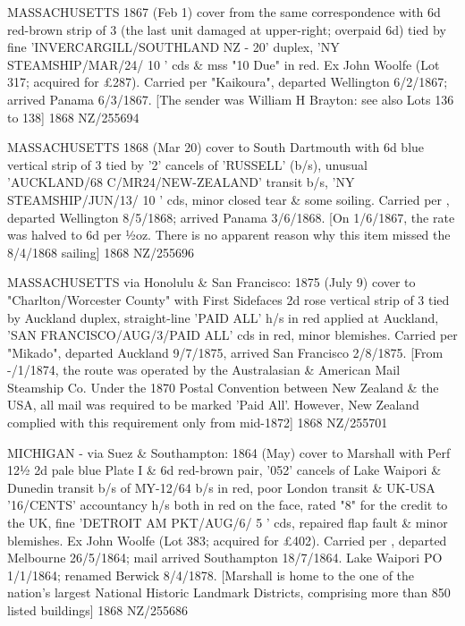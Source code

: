\documentclass[justified]{tufte-book}
\begin{document}
%
{MASSACHUSETTS 1867 (Feb 1) cover from the same correspondence with 6d red-brown strip of 3 (the last unit damaged at upper-right; overpaid 6d) tied by fine 'INVERCARGILL/SOUTHLAND NZ - 20' duplex, 'NY STEAMSHIP/MAR/24/ 10 ' cds \& mss "10 Due" in red. Ex John Woolfe (Lot 317; acquired for £287). Carried per "Kaikoura", departed Wellington 6/2/1867; arrived Panama 6/3/1867. [The sender was William H Brayton: see also Lots 136 to 138]}%
{1868}%
{NZ/255694}%
{}%
{}
{}%
{}


%
{MASSACHUSETTS 1868 (Mar 20) cover to South Dartmouth with 6d blue vertical strip of 3 tied by '2' cancels of 'RUSSELL' (b/s), unusual 'AUCKLAND/68 C/MR24/NEW-ZEALAND' transit b/s, 'NY STEAMSHIP/JUN/13/ 10 ' cds, minor closed tear \& some soiling. Carried per , departed Wellington 8/5/1868; arrived Panama 3/6/1868. [On 1/6/1867, the rate was halved to 6d per ½oz. There is no apparent reason why this item missed the 8/4/1868 sailing]}%
{1868}%
{NZ/255696}%
{}%
{}
{}%
{}

%
{MASSACHUSETTS via Honolulu \& San Francisco: 1875 (July 9) cover to "Charlton/Worcester County" with First Sidefaces 2d rose vertical strip of 3 tied by Auckland duplex, straight-line 'PAID ALL' h/s in red applied at Auckland, 'SAN FRANCISCO/AUG/3/PAID ALL' cds in red, minor blemishes. Carried per "Mikado", departed Auckland 9/7/1875, arrived San Francisco 2/8/1875. [From -/1/1874, the route was operated by the Australasian \& American Mail Steamship Co. Under the 1870 Postal Convention between New Zealand \& the USA, all mail was required to be marked 'Paid All'. However, New Zealand complied with this requirement only from mid-1872]}%
{1868}%
{NZ/255701}%
{}%
{}
{}%
{}

%
{MICHIGAN - via Suez \& Southampton: 1864 (May) cover to Marshall with Perf 12½ 2d pale blue Plate I \& 6d red-brown pair, '052' cancels of Lake Waipori \& Dunedin transit b/s of MY-12/64 b/s in red, poor London transit \& UK-USA '16/CENTS' accountancy h/s both in red on the face, rated "8" for the credit to the UK, fine 'DETROIT AM PKT/AUG/6/ 5 ' cds, repaired flap fault \& minor blemishes. Ex John Woolfe (Lot 383; acquired for £402). Carried per , departed Melbourne 26/5/1864; mail arrived Southampton 18/7/1864. Lake Waipori PO 1/1/1864; renamed Berwick 8/4/1878. [Marshall is home to the one of the nation's largest National Historic Landmark Districts, comprising more than 850 listed buildings]}%
{1868}%
{NZ/255686}%
{}%
{}
{}%
{}
\end{document}
